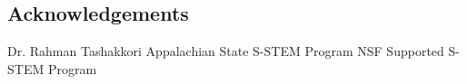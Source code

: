 \documentclass[a0,portrait]{a0poster}
\begin{document}
\begin{multicols}{2}
\nocite{*} %


\section*{Acknowledgements}

Dr. Rahman Tashakkori
Appalachian State S-STEM Program\newline
NSF Supported S-STEM Program


\end{multicols}
\end{document}
